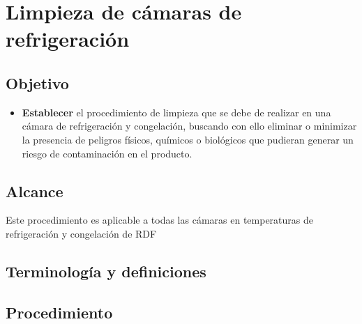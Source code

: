 \thispagestyle{formato-PI}
\renewcommand{\MayorVer}{2}
\renewcommand{\MenorVer}{0}
\renewcommand{\Titulo}{Limpieza de cámaras de refrigeración}
\renewcommand{\Codigo}{HYS-1-IT}
\renewcommand{\FechaPub}{2023--01}

\section{\Titulo}

\subsection{Objetivo}

\begin{itemize}
    \item \textbf{Establecer} el procedimiento de limpieza que se debe de realizar en una cámara de refrigeración y congelación, buscando con ello eliminar o minimizar la presencia de peligros físicos, químicos o biológicos que pudieran generar un riesgo de contaminación en el producto.
\end{itemize}


\subsection{Alcance}
Este procedimiento es aplicable a todas las cámaras en temperaturas de refrigeración y congelación de \gls{RDF}

\subsection{Terminología y definiciones}
\begin{description}
\end{description}


\subsection{Procedimiento}
